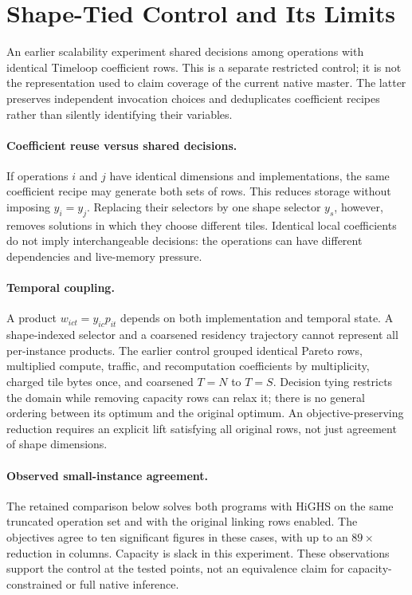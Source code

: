 \section{Shape-Tied Control and Its Limits}
\label{app:shape_agg}
An earlier scalability experiment shared decisions among operations with
identical Timeloop coefficient rows. This is a separate restricted control;
it is not the representation used to claim coverage of the current native
master. The latter preserves independent invocation choices and deduplicates
coefficient recipes rather than silently identifying their variables.

\paragraph{Coefficient reuse versus shared decisions.}
If operations $i$ and $j$ have identical dimensions and implementations, the
same coefficient recipe may generate both sets of rows. This reduces storage
without imposing $y_i=y_j$. Replacing their selectors by one shape selector
$y_s$, however, removes solutions in which they choose different tiles.
Identical local coefficients do not imply interchangeable decisions: the
operations can have different dependencies and live-memory pressure.

\paragraph{Temporal coupling.}\label{par:shape_agg_exactness}
A product $w_{ict}=y_{ic}p_{it}$ depends on both implementation and temporal
state. A shape-indexed selector and a coarsened residency trajectory cannot
represent all per-instance products. The earlier control grouped identical
Pareto rows, multiplied compute, traffic, and recomputation coefficients by
multiplicity, charged tile bytes once, and coarsened $T=N$ to $T=S$.
Decision tying restricts the domain while removing capacity rows can relax it;
there is no general ordering between its optimum and the original optimum.
An objective-preserving reduction requires an explicit lift satisfying all
original rows, not just agreement of shape dimensions.

\paragraph{Observed small-instance agreement.}
The retained comparison below solves both programs with HiGHS on the same
truncated operation set and with the original linking rows enabled. The
objectives agree to ten significant figures in these cases, with up to an
$89\times$ reduction in columns. Capacity is slack in this experiment. These
observations support the control at the tested points, not an equivalence
claim for capacity-constrained or full native inference.

